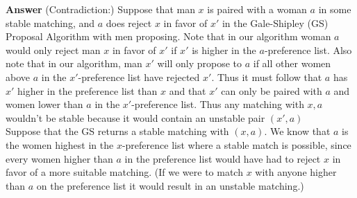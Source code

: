\documentclass{amsart}
\begin{document}
\begin{enumerate}
\textbf{Answer} (Contradiction:) Suppose that man $x$ is paired with a woman $a$ in some stable matching, and $a$ does reject $x$ in favor of $x'$ in the Gale-Shipley (GS) Proposal Algorithm with men proposing. 
Note that in our algorithm woman $a$ would only reject man $x$ in favor of $x'$ if $x'$ is higher in the $a$-preference list. Also note that in our algorithm, man $x'$ will only propose to $a$ if all other women above $a$ in the $x'$-preference list have rejected $x'$. Thus it must follow that $a$ has $x'$ higher in the preference list than $x$ and that $x'$ can only be paired with $a$ and women lower than $a$ in the $x'$-preference list. Thus any matching with $x,a$ wouldn't be stable because it would contain an unstable pair $(x',a)$\\
Suppose that the GS returns a stable matching with $(x,a)$. We know that $a$ is the women highest in the $x$-preference list where a stable match is possible, since every women higher than $a$ in the preference list would have had to reject $x$ in favor of a more suitable matching. (If we were to match $x$ with anyone higher than $a$ on the preference list it would result in an unstable matching.)



\end{enumerate}
\end{document}
